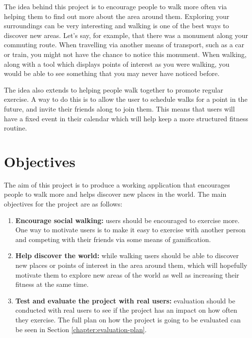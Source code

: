 The idea behind this project is to encourage people to walk more often via helping them to find out more about the area around them. Exploring your surroundings can be very interesting and walking is one of the best ways to discover new areas. Let's say, for example, that there was a monument along your commuting route. When travelling via another means of transport, such as a car or train, you might not have the chance to notice this monument. When walking, along with a tool which displays points of interest as you were walking, you would be able to see something that you may never have noticed before.

The idea also extends to helping people walk together to promote regular exercise. A way to do this is to allow the user to schedule walks for a point in the future, and invite their friends along to join them. This means that users will have a fixed event in their calendar which will help keep a more structured fitness routine.


\section{Objectives} \label{section:objectives}

The aim of this project is to produce a working application that encourages people to walk more and helps discover new places in the world. The main objectives for the project are as follows:

\begin{enumerate}[label=\textbf{Obj \arabic*}]
  \item \textbf{Encourage social walking:} users should be encouraged to exercise more.  One way to motivate users is to make it easy to exercise with another person and competing with their friends via some means of gamification.
  \item \textbf{Help discover the world:} while walking users should be able to discover new places or points of interest in the area around them, which will hopefully motivate them to explore new areas of the world as well as increasing their fitness at the same time.
  \item \textbf{Test and evaluate the project with real users:} evaluation should be conducted with real users to see if the project has an impact on how often they exercise. The full plan on how the project is going to be evaluated can be seen in Section \ref{chapter:evaluation-plan}.
\end{enumerate}







